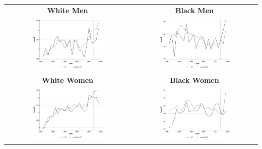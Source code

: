 \documentclass[11pt]{article}
\begin{document}
{\pagebreak
\begin{landscape}
\begin{table}[ht!]
    \centering
    \label{fig:synth_ky}
    \begin{tabular}{c c}
          \textbf{White Men} & \textbf{Black Men} \\    
          \includegraphics[width = 0.6\textwidth, keepaspectratio]{figures/fin_synth_wm_ky.png} & \includegraphics[width = 0.6\textwidth, keepaspectratio]{figures/fin_synth_bm_ky.png} \\
          \textbf{White Women} & \textbf{Black Women} \\
          \includegraphics[width = 0.6\textwidth, keepaspectratio]{figures/fin_synth_wf_ky.png} & \includegraphics[width = 0.6\textwidth, keepaspectratio]{figures/fin_synth_bf_ky.png}

\end{tabular}
\end{table}
\end{landscape}}
\end{document}
